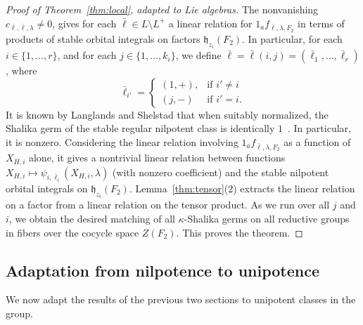 \documentclass[12pt]{amsart}
\newcommand{\fh}{\mathfrak{h}}
\theoremstyle{plain}
\theoremstyle{definition}
\begin{document}
\begin{proof}[Proof of Theorem~\ref{thm:local}, adapted to Lie algebras]
The nonvanishing $c_{{\bar\ell},{\bar\ell},\lambda}\ne 0$, gives for
each ${\bar\ell}\in L\setminus L^+$ a linear relation for
$1_af_{{\bar\ell},\lambda,F_2}$ in terms of products of stable orbital
integrals on factors $\fh_{z_i}(F_2)$.  In particular, for each
$i\in\{1,\ldots,r\}$, and for each $j\in\{1,\ldots,k_i\}$, we define
${\bar\ell} = {\bar\ell}(i,j) = ({\bar\ell}_1,\ldots,{\bar\ell}_r)$,
where
\[
{\bar\ell}_{i'} = \begin{cases} (1,+), &\text{if } i'\ne i\\
       (j,-) & \text{if } i' = i.
  \end{cases}
\]
It is known by Langlands and Shelstad that when suitably normalized,
the Shalika germ of the stable regular nilpotent class is identically
$1$~\cite{LSxf}.  In particular, it is nonzero.  Considering the
linear relation involving $1_af_{{\bar\ell},\lambda,F_2}$ as a
function of $X_{H,i}$ alone, it gives a nontrivial linear relation
between functions
$X_{H,i}\mapsto\psi_{i,\bar\ell_i}(X_{H,i},{\lambda})$ (with nonzero
coefficient) and the stable nilpotent orbital integrals on
$\fh_{z_i}(F_2)$.  Lemma~\ref{thm:tensor}(2) extracts the linear
relation on a factor from a linear relation on the tensor product.  As
we run over all $j$ and $i$, we obtain the desired matching of all
$\kappa$-Shalika germs on all reductive groups in fibers over the
cocycle space $Z(F_2)$.  This proves the theorem.
\end{proof}

\subsection{Adaptation from nilpotence to unipotence}
\label{sec:adapt}

We now adapt the results of the previous two sections to unipotent
classes in the group. 
\end{document}
